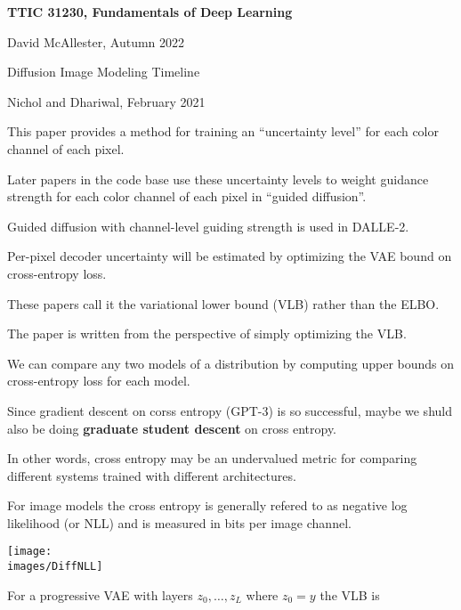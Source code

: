 





{\Huge

  \centerline{\bf TTIC 31230, Fundamentals of Deep Learning}
  \bigskip
  \centerline{David McAllester, Autumn 2022}
  \vfill
  \vfil
  \centerline{Diffusion Image Modeling Timeline}
  \vfill
  \vfill

{Nichol and Dhariwal, February 2021}

\vfill
This paper provides a method for training an ``uncertainty level'' for each color channel of each pixel.

\vfill
Later papers in the code base use these uncertainty levels to weight guidance strength for each color channel of each pixel in ``guided diffusion''.

\vfill
Guided diffusion with channel-level guiding strength is used in DALLE-2.


Per-pixel decoder uncertainty will be estimated by optimizing the VAE bound on cross-entropy loss.

\vfill
These papers call it the variational lower bound (VLB) rather than the ELBO.

\vfill
The paper is written from the perspective of simply optimizing the VLB.


We can compare any two models of a distribution by computing upper bounds on cross-entropy loss for each model.

\vfill
Since gradient descent on corss entropy (GPT-3) is so successful, maybe we shuld also be doing {\bf graduate student descent} on cross entropy.

\vfill
In other words, cross entropy may be an undervalued metric for comparing different systems trained with different architectures.



For image models the cross entropy is generally refered to as negative log likelihood (or NLL) and is measured in bits per image channel.

\centerline{\texttt{[image: \\images/DiffNLL]}}


For a progressive VAE with layers $z_0,\ldots,z_L$ where $z_0 = y$ the VLB is

}
